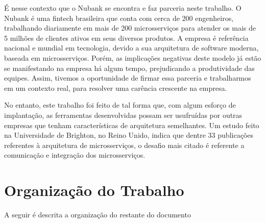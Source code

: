 	É nesse contexto que o Nubank se encontra e faz parceria neste trabalho. O Nubank é uma fintech brasileira que conta com cerca de 200 engenheiros, trabalhando diariamente em mais de 200 microsserviços para atender os mais de 5 milhões de clientes ativos em seus diversos produtos. A empresa é referência nacional e mundial em tecnologia, devido a sua arquitetura de software moderna, baseada em microsserviços. Porém, as implicações negativas deste modelo já estão se manifestando na empresa há algum tempo, prejudicando a produtividade das equipes. Assim, tivemos a oportunidade de firmar essa parceria e trabalharmos em um contexto real, para resolver uma carência crescente na empresa.
	
	No entanto, este trabalho foi feito de tal forma que, com algum esforço de implantação, as ferramentas desenvolvidas possam ser usufruídas por outras empresas que tenham características de arquitetura semelhantes. Um estudo feito na Universidade de Brighton, no Reino Unido, indica que dentre 33 publicações referentes à arquitetura de microsserviços, o desafio mais citado é referente a comunicação e integração dos microsserviços.\cite{systematicmapping}
	\section{Organização do Trabalho}
	A seguir é descrita a organização do restante do documento
	
